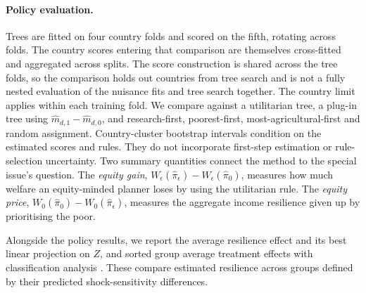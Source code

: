 \paragraph{Policy evaluation.} Trees are fitted on four country folds and scored on
the fifth, rotating across folds. The country scores entering that comparison are themselves
cross-fitted and aggregated across splits. The score construction is shared across the
tree folds, so the comparison holds out countries from tree search and is not a fully
nested evaluation of the nuisance fits and tree search together. The country limit
applies within each training fold. We compare against a utilitarian tree, a plug-in tree
using $\hat m_{d,1}-\hat m_{d,0}$, and research-first, poorest-first,
most-agricultural-first and random assignment. Country-cluster bootstrap intervals
condition on the estimated scores and rules. They do not incorporate first-step
estimation or rule-selection uncertainty. Two summary quantities connect the method to the special issue's
question. The \emph{equity gain}, $W_\epsilon(\hat\pi_\epsilon)-W_\epsilon(\hat\pi_0)$, measures how
much welfare an equity-minded planner loses by using the utilitarian rule. The \emph{equity price},
$W_0(\hat\pi_0)-W_0(\hat\pi_\epsilon)$, measures the aggregate income resilience given up by
prioritising the poor.

Alongside the policy results, we report the average resilience effect and its best linear
projection on $Z$, and sorted group average treatment effects with classification analysis
\citep[GATES and CLAN;][]{chernozhukov2025}. These compare estimated resilience across groups defined by their predicted
shock-sensitivity differences.
